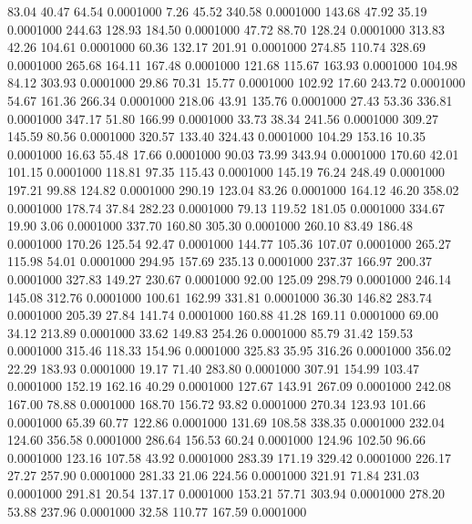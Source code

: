   83.04   40.47   64.54   0.0001000
   7.26   45.52  340.58   0.0001000
 143.68   47.92   35.19   0.0001000
 244.63  128.93  184.50   0.0001000
  47.72   88.70  128.24   0.0001000
 313.83   42.26  104.61   0.0001000
  60.36  132.17  201.91   0.0001000
 274.85  110.74  328.69   0.0001000
 265.68  164.11  167.48   0.0001000
 121.68  115.67  163.93   0.0001000
 104.98   84.12  303.93   0.0001000
  29.86   70.31   15.77   0.0001000
 102.92   17.60  243.72   0.0001000
  54.67  161.36  266.34   0.0001000
 218.06   43.91  135.76   0.0001000
  27.43   53.36  336.81   0.0001000
 347.17   51.80  166.99   0.0001000
  33.73   38.34  241.56   0.0001000
 309.27  145.59   80.56   0.0001000
 320.57  133.40  324.43   0.0001000
 104.29  153.16   10.35   0.0001000
  16.63   55.48   17.66   0.0001000
  90.03   73.99  343.94   0.0001000
 170.60   42.01  101.15   0.0001000
 118.81   97.35  115.43   0.0001000
 145.19   76.24  248.49   0.0001000
 197.21   99.88  124.82   0.0001000
 290.19  123.04   83.26   0.0001000
 164.12   46.20  358.02   0.0001000
 178.74   37.84  282.23   0.0001000
  79.13  119.52  181.05   0.0001000
 334.67   19.90    3.06   0.0001000
 337.70  160.80  305.30   0.0001000
 260.10   83.49  186.48   0.0001000
 170.26  125.54   92.47   0.0001000
 144.77  105.36  107.07   0.0001000
 265.27  115.98   54.01   0.0001000
 294.95  157.69  235.13   0.0001000
 237.37  166.97  200.37   0.0001000
 327.83  149.27  230.67   0.0001000
  92.00  125.09  298.79   0.0001000
 246.14  145.08  312.76   0.0001000
 100.61  162.99  331.81   0.0001000
  36.30  146.82  283.74   0.0001000
 205.39   27.84  141.74   0.0001000
 160.88   41.28  169.11   0.0001000
  69.00   34.12  213.89   0.0001000
  33.62  149.83  254.26   0.0001000
  85.79   31.42  159.53   0.0001000
 315.46  118.33  154.96   0.0001000
 325.83   35.95  316.26   0.0001000
 356.02   22.29  183.93   0.0001000
  19.17   71.40  283.80   0.0001000
 307.91  154.99  103.47   0.0001000
 152.19  162.16   40.29   0.0001000
 127.67  143.91  267.09   0.0001000
 242.08  167.00   78.88   0.0001000
 168.70  156.72   93.82   0.0001000
 270.34  123.93  101.66   0.0001000
  65.39   60.77  122.86   0.0001000
 131.69  108.58  338.35   0.0001000
 232.04  124.60  356.58   0.0001000
 286.64  156.53   60.24   0.0001000
 124.96  102.50   96.66   0.0001000
 123.16  107.58   43.92   0.0001000
 283.39  171.19  329.42   0.0001000
 226.17   27.27  257.90   0.0001000
 281.33   21.06  224.56   0.0001000
 321.91   71.84  231.03   0.0001000
 291.81   20.54  137.17   0.0001000
 153.21   57.71  303.94   0.0001000
 278.20   53.88  237.96   0.0001000
  32.58  110.77  167.59   0.0001000
